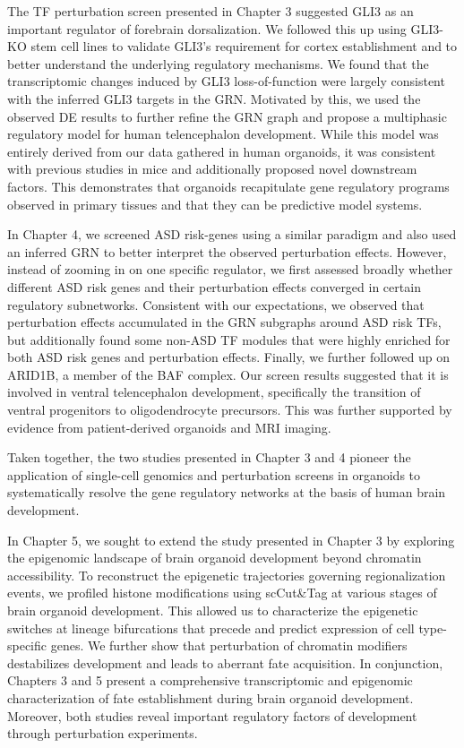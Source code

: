 The TF perturbation screen presented in Chapter 3 suggested GLI3 as an important regulator of forebrain dorsalization. We followed this up using GLI3-KO stem cell lines to validate GLI3's requirement for cortex establishment and to better understand the underlying regulatory mechanisms. We found that the transcriptomic changes induced by GLI3 loss-of-function were largely consistent with the inferred GLI3 targets in the GRN. Motivated by this, we used the observed DE results to further refine the GRN graph and propose a multiphasic regulatory model for human telencephalon development. While this model was entirely derived from our data gathered in human organoids, it was consistent with previous studies in mice and additionally proposed novel downstream factors. This demonstrates that organoids recapitulate gene regulatory programs observed in primary tissues and that they can be predictive model systems.

In Chapter 4, we screened ASD risk-genes using a similar paradigm and also used an inferred GRN to better interpret the observed perturbation effects. However, instead of zooming in on one specific regulator, we first assessed broadly whether different ASD risk genes and their perturbation effects converged in certain regulatory subnetworks. Consistent with our expectations, we observed that perturbation effects accumulated in the GRN subgraphs around ASD risk TFs, but additionally found some non-ASD TF modules that were highly enriched for both ASD risk genes and perturbation effects. Finally, we further followed up on ARID1B, a member of the BAF complex. Our screen results suggested that it is involved in ventral telencephalon development, specifically the transition of ventral progenitors to oligodendrocyte precursors. This was further supported by evidence from patient-derived organoids and MRI imaging. 

Taken together, the two studies presented in Chapter 3 and 4 pioneer the application of single-cell genomics and perturbation screens in organoids to systematically resolve the gene regulatory networks at the basis of human brain development. 

In Chapter 5, we sought to extend the study presented in Chapter 3 by exploring the epigenomic landscape of brain organoid development beyond chromatin accessibility. To reconstruct the epigenetic trajectories governing regionalization events, we profiled histone modifications using scCut\&Tag at various stages of brain organoid development. This allowed us to characterize the epigenetic switches at lineage bifurcations that precede and predict expression of cell type-specific genes. We further show that  perturbation of chromatin modifiers destabilizes development and leads to aberrant fate acquisition. In conjunction, Chapters 3 and 5 present a comprehensive transcriptomic and epigenomic characterization of fate establishment during brain organoid development. Moreover, both studies reveal important regulatory factors of development through perturbation experiments.



